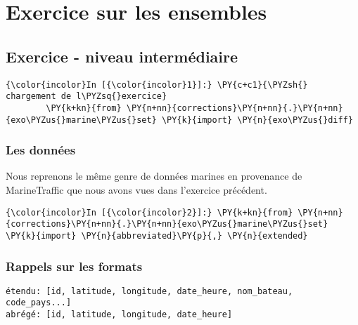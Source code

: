    
    
    
    

    

    \hypertarget{exercice-sur-les-ensembles}{%
\section{Exercice sur les ensembles}\label{exercice-sur-les-ensembles}}

    \hypertarget{exercice---niveau-intermuxe9diaire}{%
\subsection{Exercice - niveau
intermédiaire}\label{exercice---niveau-intermuxe9diaire}}

    \begin{Verbatim}[commandchars=\\\{\}]
{\color{incolor}In [{\color{incolor}1}]:} \PY{c+c1}{\PYZsh{} chargement de l\PYZsq{}exercice}
        \PY{k+kn}{from} \PY{n+nn}{corrections}\PY{n+nn}{.}\PY{n+nn}{exo\PYZus{}marine\PYZus{}set} \PY{k}{import} \PY{n}{exo\PYZus{}diff}
\end{Verbatim}


    \hypertarget{les-donnuxe9es}{%
\subsubsection{Les données}\label{les-donnuxe9es}}

    Nous reprenons le même genre de données marines en provenance de
MarineTraffic que nous avons vues dans l'exercice précédent.

    \begin{Verbatim}[commandchars=\\\{\}]
{\color{incolor}In [{\color{incolor}2}]:} \PY{k+kn}{from} \PY{n+nn}{corrections}\PY{n+nn}{.}\PY{n+nn}{exo\PYZus{}marine\PYZus{}set} \PY{k}{import} \PY{n}{abbreviated}\PY{p}{,} \PY{n}{extended}
\end{Verbatim}


    \hypertarget{rappels-sur-les-formats}{%
\subsubsection{Rappels sur les formats}\label{rappels-sur-les-formats}}

    \begin{verbatim}
étendu: [id, latitude, longitude, date_heure, nom_bateau, code_pays...]
abrégé: [id, latitude, longitude, date_heure]
\end{verbatim}

